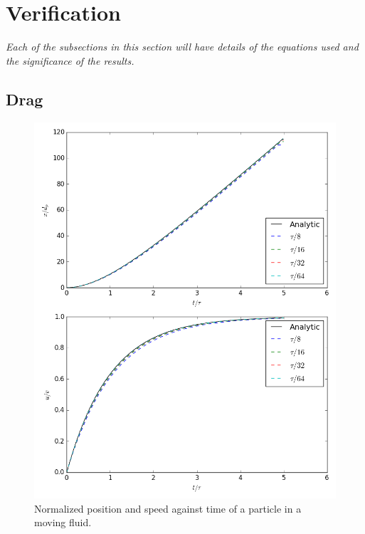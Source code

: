 \documentclass[10pt,a4paper,titlepage]{report}
\begin{document}
\section{Verification}
\textit{Each of the subsections in this section will have details of the equations used and the significance of the results.}
\subsection{Drag}
\begin{figure}[!htb]
\centering
\includegraphics[scale=0.5]{figures/opencl_verification/drag_verification.png}
\caption{Normalized position and speed against time of a particle in a moving fluid.}
\label{fig:opencl_drag_verification}
\end{figure}
\end{document}
